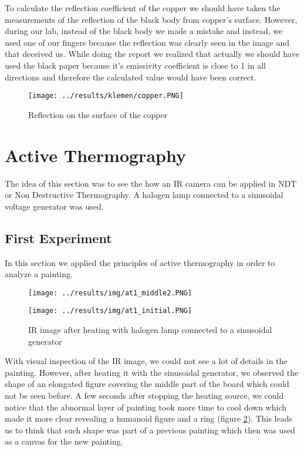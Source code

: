\documentclass{article}
\begin{document}
To calculate the reflection coefficient of the copper we should have 
taken the measurements of the reflection of the black body from copper's surface.
However, during our lab, instead of the black body we made a mistake
and instead, we used one of our fingers because
the reflection was clearly seen in the image and that deceived us. 
While doing the report
we realized that actually we should have used the black paper because it's emissivity
coefficient is close to 1 in all directions and therefore the calculated
value would have been correct.

\begin{figure}[H]
\centering
\begin{minipage}[b]{0.5\linewidth}
\texttt{[image: ../results/klemen/copper.PNG]}
\end{minipage}
\caption{Reflection on the surface of the copper}
\label{fig:calib}
\end{figure}

\section{Active Thermography}

The idea of this section was to see the how an IR camera can 
be applied in NDT or Non Destructive Thermography. A halogen lamp 
connected to a sinusoidal voltage generator was used.

\subsection{First Experiment}

In this section we applied the principles of active thermography
in order to analyze a painting. 

\begin{figure}[H]
\centering
\begin{minipage}[b]{0.4\linewidth}
\texttt{[image: ../results/img/at1\_middle2.PNG]}
\end{minipage}
\quad
\begin{minipage}[b]{0.4\linewidth}
\texttt{[image: ../results/img/at1\_initial.PNG]}
\end{minipage}
\caption{IR image after heating with halogen lamp connected to a sinusoidal generator}
\label{fig:at1}
\end{figure}

With visual inspection of the IR image, we could not see a lot of details in the painting. 
However, after heating it with the sinusoidal generator, we observed the
shape of an elongated figure covering the middle part of the board which
could not be seen before. A few seconds after stopping the heating
source, we could notice that the abnormal layer of painting
took more time to cool down which made it more clear revealing a humanoid
figure and a ring (figure \ref{fig:at1}). This leads us to think 
that such shape was part of a previous painting which then 
was used as a canvas for the new painting.
\end{document}
